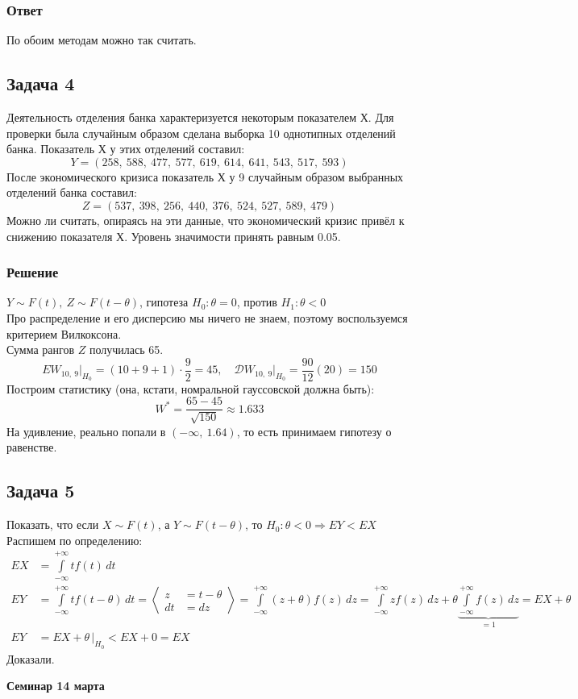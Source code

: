 \documentclass[12pt, a4paper]{article}
\newcommand{\dev}{\mathcal{D}}
\begin{document}
\subsubsection*{Ответ}
По обоим методам можно так считать.

\subsection*{Задача 4}
Деятельность отделения банка характеризуется некоторым показателем Х. Для проверки была случайным образом сделана выборка 10 однотипных отделений банка. Показатель Х у этих отделений составил:
\[Y = (258,\ 588,\ 477,\ 577,\ 619,\ 614,\ 641,\ 543,\ 517,\ 593)\]
После экономического кризиса показатель Х у 9 случайным образом выбранных отделений банка составил:
\[Z = (537,\ 398,\ 256,\ 440,\ 376,\ 524,\ 527,\ 589,\ 479)\]
Можно ли считать, опираясь на эти данные, что экономический кризис привёл к снижению показателя Х. Уровень значимости принять равным 0.05.
\subsubsection*{Решение}
$Y \sim F(t),\ Z \sim F(t - \theta)$, гипотеза $H_0: \theta = 0 $, против $H_1: \theta < 0$\\
Про распределение и его дисперсию мы ничего не знаем, поэтому воспользуемся критерием Вилкоксона.\\
Сумма рангов $Z$ получилась 65.
\[EW_{10,\ 9}\Big|_{H_0} = (10 + 9 + 1)\cdot \frac{9}{2} = 45,\quad \dev W_{10,\ 9} \Big|_{H_0} = \frac{90}{12}(20) = 150\]
Построим статистику (она, кстати, номральной гауссовской должна быть):
\[W^* = \frac{65 - 45}{\sqrt{150}} \approx 1.633\]
На удивление, реально попали в $(-\infty,\ 1.64)$, то есть принимаем гипотезу о равенстве. 
\subsection*{Задача 5}
Показать, что если $X\sim F(t)$, а $Y\sim F(t - \theta)$, то $H_0: \theta < 0 \Rightarrow EY < EX$\\
Распишем по определению:
\begin{equation*}
    \begin{aligned}
        EX &= \int\limits_{-\infty}^{+\infty} tf(t)\, dt\\
        EY &= \int\limits_{-\infty}^{+\infty} tf(t - \theta)\, dt = \left< \begin{aligned}
            z &= t - \theta\\
            dt &= dz
        \end{aligned} \right> = \int\limits_{-\infty}^{+\infty} (z + \theta) f(z)\, dz = \int\limits_{-\infty}^{+\infty} zf(z)\, dz + \theta \underset{=1}{\underbrace{\int\limits_{-\infty}^{+\infty} f(z)\, dz}} = EX + \theta\\
        EY &= EX + \theta\, \Big|_{H_0} < EX + 0 = EX
    \end{aligned}
\end{equation*}
Доказали.
\begin{center}
    \bf Семинар 14 марта
\end{center}
\end{document}
